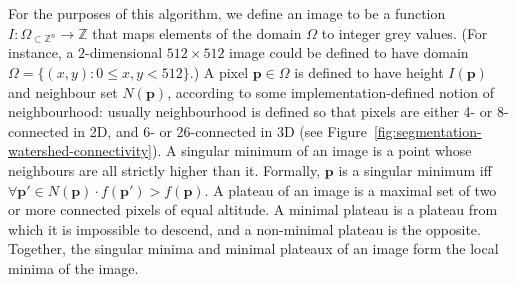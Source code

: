 For the purposes of this algorithm, we define an image to be a function $I: \Omega_{\subset \mathbb{Z}^n} \to \mathbb{Z}$ that maps elements of the domain $\Omega$ to integer grey values. (For instance, a $2$-dimensional $512 \times 512$ image could be defined to have domain $\Omega = \{(x,y) : 0 \le x,y < 512\}$.) A pixel $\mathbf{p} \in \Omega$ is defined to have height $I(\mathbf{p})$ and neighbour set $N(\mathbf{p})$, according to some implementation-defined notion of neighbourhood: usually neighbourhood is defined so that pixels are either 4- or 8-connected in 2D, and 6- or 26-connected in 3D (see Figure~\ref{fig:segmentation-watershed-connectivity}). A singular minimum of an image is a point whose neighbours are all strictly higher than it. Formally, $\mathbf{p}$ is a singular minimum iff $\forall \mathbf{p'} \in N(\mathbf{p}) \cdot f(\mathbf{p'}) > f(\mathbf{p})$. A plateau of an image is a maximal set of two or more connected pixels of equal altitude. A minimal plateau is a plateau from which it is impossible to descend, and a non-minimal plateau is the opposite. Together, the singular minima and minimal plateaux of an image form the local minima of the image.


